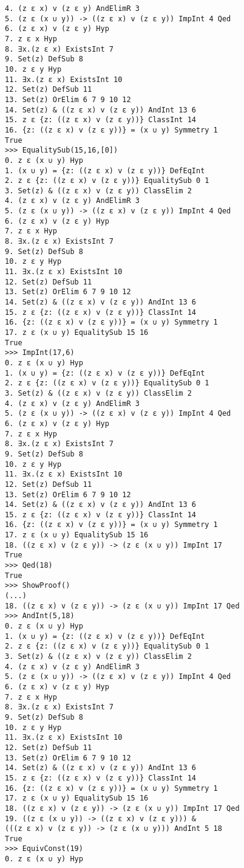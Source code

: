 \documentclass[a4paper,12pt,leqno]{article}
\numberwithin{equation}{section}
\begin{document}
\begin{verbatim}
4. (z ε x) v (z ε y) AndElimR 3
5. (z ε (x ∪ y)) -> ((z ε x) v (z ε y)) ImpInt 4 Qed
6. (z ε x) v (z ε y) Hyp 
7. z ε x Hyp 
8. ∃x.(z ε x) ExistsInt 7
9. Set(z) DefSub 8
10. z ε y Hyp 
11. ∃x.(z ε x) ExistsInt 10
12. Set(z) DefSub 11
13. Set(z) OrElim 6 7 9 10 12
14. Set(z) & ((z ε x) v (z ε y)) AndInt 13 6
15. z ε {z: ((z ε x) v (z ε y))} ClassInt 14
16. {z: ((z ε x) v (z ε y))} = (x ∪ y) Symmetry 1
True
>>> EqualitySub(15,16,[0])
0. z ε (x ∪ y) Hyp 
1. (x ∪ y) = {z: ((z ε x) v (z ε y))} DefEqInt 
2. z ε {z: ((z ε x) v (z ε y))} EqualitySub 0 1
3. Set(z) & ((z ε x) v (z ε y)) ClassElim 2
4. (z ε x) v (z ε y) AndElimR 3
5. (z ε (x ∪ y)) -> ((z ε x) v (z ε y)) ImpInt 4 Qed
6. (z ε x) v (z ε y) Hyp 
7. z ε x Hyp 
8. ∃x.(z ε x) ExistsInt 7
9. Set(z) DefSub 8
10. z ε y Hyp 
11. ∃x.(z ε x) ExistsInt 10
12. Set(z) DefSub 11
13. Set(z) OrElim 6 7 9 10 12
14. Set(z) & ((z ε x) v (z ε y)) AndInt 13 6
15. z ε {z: ((z ε x) v (z ε y))} ClassInt 14
16. {z: ((z ε x) v (z ε y))} = (x ∪ y) Symmetry 1
17. z ε (x ∪ y) EqualitySub 15 16
True
>>> ImpInt(17,6)
0. z ε (x ∪ y) Hyp 
1. (x ∪ y) = {z: ((z ε x) v (z ε y))} DefEqInt 
2. z ε {z: ((z ε x) v (z ε y))} EqualitySub 0 1
3. Set(z) & ((z ε x) v (z ε y)) ClassElim 2
4. (z ε x) v (z ε y) AndElimR 3
5. (z ε (x ∪ y)) -> ((z ε x) v (z ε y)) ImpInt 4 Qed
6. (z ε x) v (z ε y) Hyp 
7. z ε x Hyp 
8. ∃x.(z ε x) ExistsInt 7
9. Set(z) DefSub 8
10. z ε y Hyp 
11. ∃x.(z ε x) ExistsInt 10
12. Set(z) DefSub 11
13. Set(z) OrElim 6 7 9 10 12
14. Set(z) & ((z ε x) v (z ε y)) AndInt 13 6
15. z ε {z: ((z ε x) v (z ε y))} ClassInt 14
16. {z: ((z ε x) v (z ε y))} = (x ∪ y) Symmetry 1
17. z ε (x ∪ y) EqualitySub 15 16
18. ((z ε x) v (z ε y)) -> (z ε (x ∪ y)) ImpInt 17
True
>>> Qed(18)
True
>>> ShowProof()
(...)
18. ((z ε x) v (z ε y)) -> (z ε (x ∪ y)) ImpInt 17 Qed
>>> AndInt(5,18)
0. z ε (x ∪ y) Hyp 
1. (x ∪ y) = {z: ((z ε x) v (z ε y))} DefEqInt 
2. z ε {z: ((z ε x) v (z ε y))} EqualitySub 0 1
3. Set(z) & ((z ε x) v (z ε y)) ClassElim 2
4. (z ε x) v (z ε y) AndElimR 3
5. (z ε (x ∪ y)) -> ((z ε x) v (z ε y)) ImpInt 4 Qed
6. (z ε x) v (z ε y) Hyp 
7. z ε x Hyp 
8. ∃x.(z ε x) ExistsInt 7
9. Set(z) DefSub 8
10. z ε y Hyp 
11. ∃x.(z ε x) ExistsInt 10
12. Set(z) DefSub 11
13. Set(z) OrElim 6 7 9 10 12
14. Set(z) & ((z ε x) v (z ε y)) AndInt 13 6
15. z ε {z: ((z ε x) v (z ε y))} ClassInt 14
16. {z: ((z ε x) v (z ε y))} = (x ∪ y) Symmetry 1
17. z ε (x ∪ y) EqualitySub 15 16
18. ((z ε x) v (z ε y)) -> (z ε (x ∪ y)) ImpInt 17 Qed
19. ((z ε (x ∪ y)) -> ((z ε x) v (z ε y))) & 
(((z ε x) v (z ε y)) -> (z ε (x ∪ y))) AndInt 5 18
True
>>> EquivConst(19)
0. z ε (x ∪ y) Hyp 

\end{verbatim}
\end{document}
